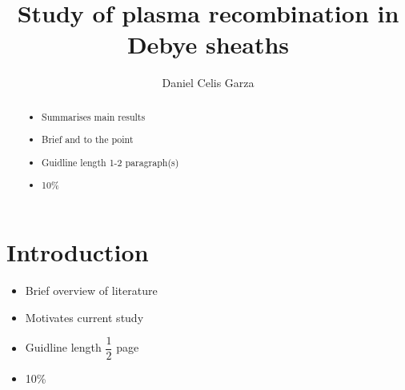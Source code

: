 \documentclass[aip,apl]{revtex4-1}
\begin{document}
	\title{Study of plasma recombination in Debye sheaths}
	\author{Daniel Celis Garza}
	\begin{abstract}
		\begin{itemize}
			\item Summarises main results
			\item Brief and to the point
			\item Guidline length 1-2 paragraph(s)
			\item 10\%
		\end{itemize}
	\end{abstract}
	\maketitle
	
	\section{Introduction}
	\begin{itemize}
		\item Brief overview of literature
		\item Motivates current study
		\item Guidline length $\dfrac{1}{2}$ page
		\item 10\%
	\end{itemize}
	
\end{document}
